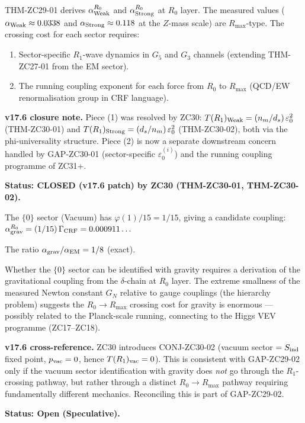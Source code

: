 \documentclass[12pt, a4paper]{article}
\begin{document}
\begin{openqbox}[title={GAP-ZC29-01: $R_0 \to R_{\max}$ Crossing
  Cost for Weak and Strong Sectors (CLOSED v17.6 patch by ZC30)}]
THM-ZC29-01 derives $\alpha_{\rm Weak}^{R_0}$ and
$\alpha_{\rm Strong}^{R_0}$ at $R_0$ layer.
The measured values ($\alpha_{\rm Weak} \approx 0.0338$ and
$\alpha_{\rm Strong} \approx 0.118$ at the $Z$-mass scale)
are $R_{\max}$-type.
The crossing cost for each sector requires:
\begin{enumerate}[leftmargin=*, noitemsep]
  \item Sector-specific $R_1$-wave dynamics in $G_5$ and $G_3$
    channels (extending THM-ZC27-01 from the EM sector).
  \item The running coupling exponent for each force
    from $R_0$ to $R_{\max}$ (QCD/EW renormalisation group
    in CRF language).
\end{enumerate}

\textbf{v17.6 closure note.}
Piece (1) was resolved by ZC30:
$T(R_1)_{\rm Weak} = (n_m/d_s)\,\varepsilon_0^2$ (THM-ZC30-01)
and $T(R_1)_{\rm Strong} = (d_s/n_m)\,\varepsilon_0^2$
(THM-ZC30-02), both via the phi-universality structure.
Piece (2) is now a separate downstream concern handled by
GAP-ZC30-01 (sector-specific $\varepsilon_0^{(i)}$) and the
running coupling programme of ZC31+.

\textbf{Status: CLOSED (v17.6 patch) by ZC30
(THM-ZC30-01, THM-ZC30-02).}
\end{openqbox}

\begin{openqbox}[title={GAP-ZC29-02: Gravity from the Vacuum
  Sector (Open, Speculative)}]
The $\{0\}$ sector (Vacuum) has $\varphi(1)/15 = 1/15$,
giving a candidate coupling:
$\alpha_{\rm grav}^{R_0} = (1/15)\,\Gamma_{\rm CRF}
= 0.000911\ldots$

The ratio $\alpha_{\rm grav}/\alpha_{\rm EM} = 1/8$ (exact).

Whether the $\{0\}$ sector can be identified with gravity
requires a derivation of the gravitational coupling from the
$\delta$-chain at $R_0$ layer.
The extreme smallness of the measured Newton constant
$G_N$ relative to gauge couplings (the hierarchy problem)
suggests the $R_0 \to R_{\max}$ crossing cost for gravity
is enormous --- possibly related to the Planck-scale
running, connecting to the Higgs VEV programme (ZC17--ZC18).

\textbf{v17.6 cross-reference.}
ZC30 introduces CONJ-ZC30-02 (vacuum sector $= S_{\rm ind}$
fixed point, $p_{\rm vac} = 0$, hence $T(R_1)_{\rm vac} = 0$).
This is consistent with GAP-ZC29-02 only if the vacuum sector
identification with gravity does \emph{not} go through the
$R_1$-crossing pathway, but rather through a distinct
$R_0 \to R_{\max}$ pathway requiring fundamentally different
mechanics. Reconciling this is part of GAP-ZC29-02.

\textbf{Status: Open (Speculative).}
\end{openqbox}
\end{document}
